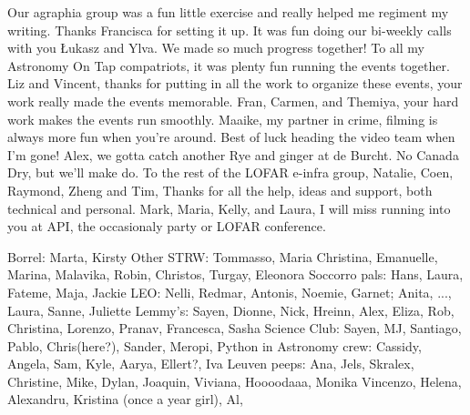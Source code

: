 \begin{thesisacknowledgements}
   Our agraphia group was a fun little exercise and really helped me regiment my writing. Thanks Francisca for setting it up. It was fun doing our bi-weekly calls with you \L{}ukasz and Ylva. We made so much progress together! To all my Astronomy On Tap compatriots, it was plenty fun running the events together. Liz and Vincent, thanks for putting in all the work to organize these events, your work really made the events memorable. Fran, Carmen,  and Themiya, your hard work makes the events run smoothly. Maaike, my partner in crime, filming is always more fun when you're around. Best of luck heading the video team when I'm gone! Alex, we gotta catch another Rye and ginger at de Burcht. No Canada Dry, but we'll make do. To the rest of the LOFAR e-infra group, Natalie, Coen, Raymond, Zheng and Tim, Thanks for all the help, ideas and support, both technical and personal. Mark, Maria, Kelly, and Laura, I will miss running into you at API, the occasionaly party or LOFAR conference. 


    Borrel: Marta, Kirsty
    Other STRW: Tommasso, Maria Christina, Emanuelle, Marina, Malavika, Robin, Christos, Turgay, Eleonora
    Soccorro pals: Hans, Laura, Fateme, Maja, Jackie
    LEO: Nelli, Redmar, Antonis, Noemie, Garnet; Anita, ..., Laura, Sanne, Juliette
    Lemmy's: Sayen, Dionne, Nick, Hreinn, Alex, Eliza, Rob, Christina, Lorenzo, Pranav, Francesca, Sasha
    Science Club: Sayen, MJ, Santiago, Pablo, Chris(here?), Sander, Meropi, 
    Python in Astronomy crew: Cassidy, Angela, Sam, Kyle, Aarya, Ellert?, Iva
    Leuven peeps: Ana, Jels, Skralex, Christine, Mike, Dylan, Joaquin, Viviana, Hoooodaaa, Monika
    Vincenzo, Helena, Alexandru, Kristina (once a year girl), Al, 

\end{thesisacknowledgements}


